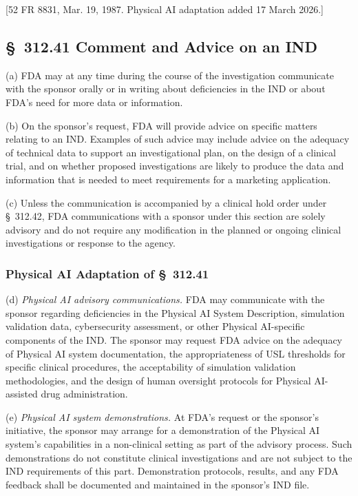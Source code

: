 [52 FR 8831, Mar. 19, 1987. Physical AI adaptation added 17 March 2026.]

\subsection{\S~312.41 Comment and Advice on an IND}

(a) FDA may at any time during the course of the investigation communicate with the sponsor orally or in writing about deficiencies in the IND or about FDA's need for more data or information.

(b) On the sponsor's request, FDA will provide advice on specific matters relating to an IND. Examples of such advice may include advice on the adequacy of technical data to support an investigational plan, on the design of a clinical trial, and on whether proposed investigations are likely to produce the data and information that is needed to meet requirements for a marketing application.

(c) Unless the communication is accompanied by a clinical hold order under \S~312.42, FDA communications with a sponsor under this section are solely advisory and do not require any modification in the planned or ongoing clinical investigations or response to the agency.

\subsubsection{Physical AI Adaptation of \S~312.41}

(d) \textit{Physical AI advisory communications.} FDA may communicate with the sponsor regarding deficiencies in the Physical AI System Description, simulation validation data, cybersecurity assessment, or other Physical AI-specific components of the IND. The sponsor may request FDA advice on the adequacy of Physical AI system documentation, the appropriateness of USL thresholds for specific clinical procedures, the acceptability of simulation validation methodologies, and the design of human oversight protocols for Physical AI-assisted drug administration.

(e) \textit{Physical AI system demonstrations.} At FDA's request or the sponsor's initiative, the sponsor may arrange for a demonstration of the Physical AI system's capabilities in a non-clinical setting as part of the advisory process. Such demonstrations do not constitute clinical investigations and are not subject to the IND requirements of this part. Demonstration protocols, results, and any FDA feedback shall be documented and maintained in the sponsor's IND file.

